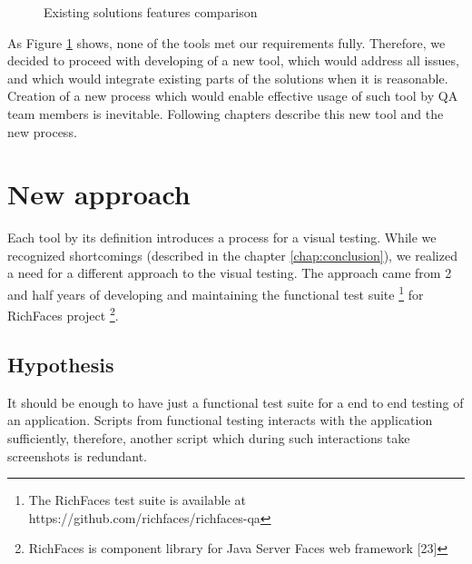 \documentclass[11pt,oneside,final]{fithesis2}
\begin{document}
  \begin{figure}[!htb]
    \begin{center}
    \leavevmode
    \centerline{}
    \end{center}
    \caption{Existing solutions features comparison}
    \label{fig:existingSolutionComparison} 
  \end{figure}
  
  As Figure \ref{fig:existingSolutionComparison} shows, none of the tools met our requirements fully. Therefore, we decided to proceed with developing of a new tool, which would address
  all issues, and which would integrate existing parts of the solutions when it is reasonable. Creation of a new process which would enable effective usage of such
  tool by QA team members is inevitable. Following chapters describe this new tool and the new process.
  
\chapter{New approach}
  Each tool by its definition introduces a process for a visual testing. While we recognized shortcomings (described in the chapter \ref{chap:conclusion}), we realized a need for a different 
  approach to the visual testing. The approach came from 2 and half years of developing and maintaining the functional test suite \footnote{The RichFaces test suite is available at 
  https://github.com/richfaces/richfaces-qa} for RichFaces project \footnote{RichFaces is component library for Java Server Faces web framework [23]}.
  
  \section{Hypothesis}
  It should be enough to have just a functional test suite for a end to end testing of an application. Scripts from functional testing interacts with the application sufficiently, 
  therefore, another script which during such interactions take screenshots is redundant.
  
\end{document}
